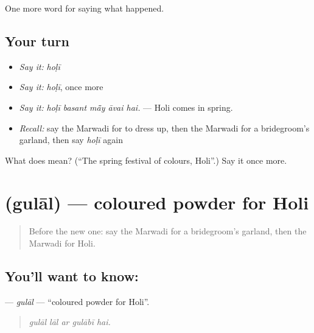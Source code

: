 \begin{grammarlens}[title={What you've built}]
One more word for saying what happened.
\end{grammarlens}

\subsection*{Your turn}
\begin{itemize}
\raggedright
  \item \emph{Say it:} \emph{hoḷī}
  \item \emph{Say it:} \emph{hoḷī}, once more
  \item \emph{Say it:} \emph{hoḷī basant mā̃y āvai hai.} — Holi comes in spring.
  \item \emph{Recall:} say the Marwadi for to dress up, then the Marwadi for a bridegroom's garland, then say \emph{hoḷī} again
\end{itemize}

\begin{tcolorbox}[breakable,colback=teal!4,colframe=teal!35!black,title={Before you move on}]
What does  mean? (\textquotedblleft{}The spring festival of colours, Holi\textquotedblright{}.) Say it once more.
\end{tcolorbox}
\section[\texorpdfstring{\mw{गुलाल} (gulāl)}{गुलाल (gulāl)}]{ (gulāl) — coloured powder for Holi}

\label{lesson:MW-C249-gulal}



\begin{quote}
Before the new one: say the Marwadi for a bridegroom's garland, then the Marwadi for Holi.
\end{quote}

\subsection*{You'll want to know: }
\textbf{} — \emph{gulāl} — \textquotedblleft{}coloured powder for Holi\textquotedblright{}.

\begin{quote}
    
\end{quote}

\begin{quote}
\emph{gulāl lāl ar gulābī hai.}
\end{quote}

